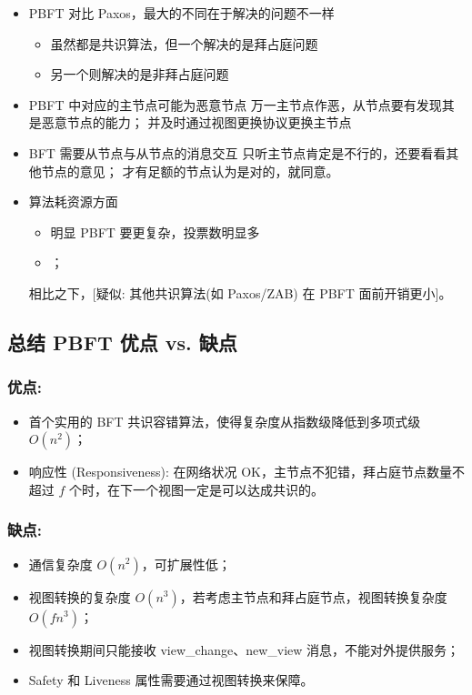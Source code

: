 \begin{itemize}
  \item PBFT 对比 Paxos，最大的不同在于解决的问题不一样
  \begin{itemize}
    \item 虽然都是共识算法，但一个解决的是拜占庭问题
    \item 另一个则解决的是非拜占庭问题
  \end{itemize}
  \item PBFT 中对应的主节点可能为恶意节点
  万一主节点作恶，从节点要有发现其是恶意节点的能力；
  并及时通过视图更换协议更换主节点
  \item BFT 需要从节点与从节点的消息交互
  只听主节点肯定是不行的，还要看看其他节点的意见；
  才有足额的节点认为是对的，就同意。
  \item 算法耗资源方面
  \begin{itemize}
    \item 明显 PBFT 要更复杂，投票数明显多
    \item [疑似: 内存占用、带宽开销更大]；
  \end{itemize}
  相比之下，[疑似: 其他共识算法(如 Paxos/ZAB) 在 PBFT 面前开销更小]。
\end{itemize}

\subsection{总结 PBFT 优点 vs. 缺点}

\subsubsection{优点:}

\begin{itemize}
  \item 首个实用的 BFT 共识容错算法，使得复杂度从指数级降低到多项式级 $O(n^2)$；
  \item 响应性 (Responsiveness): 在网络状况 OK，主节点不犯错，拜占庭节点数量不超过 $f$ 个时，在下一个视图一定是可以达成共识的。
\end{itemize}

\subsubsection{缺点:}

\begin{itemize}
  \item 通信复杂度 $O(n^2)$，可扩展性低；
  \item 视图转换的复杂度 $O(n^3)$，若考虑主节点和拜占庭节点，视图转换复杂度 $O(f n^3)$；
  \item 视图转换期间只能接收 view\_change、new\_view 消息，不能对外提供服务；
  \item Safety 和 Liveness 属性需要通过视图转换来保障。
\end{itemize}

